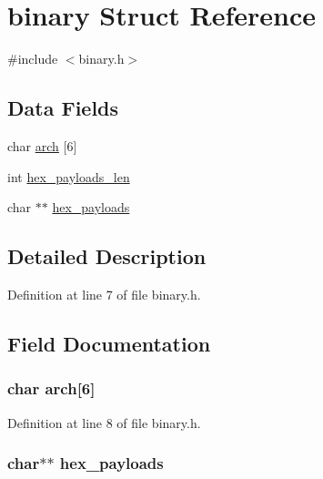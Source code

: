 \hypertarget{structbinary}{}\section{binary Struct Reference}
\label{structbinary}


{\ttfamily \#include $<$binary.\+h$>$}

\subsection*{Data Fields}
\begin{DoxyCompactItemize}
\item 
char \hyperlink{structbinary_a51de8a8ff4eea181532ea93a70052c48}{arch} \mbox{[}6\mbox{]}
\item 
int \hyperlink{structbinary_afc8f291557c42095685d2a9af0a3416a}{hex\+\_\+payloads\+\_\+len}
\item 
char $\ast$$\ast$ \hyperlink{structbinary_ae54411fb77f40653065d613c653083dd}{hex\+\_\+payloads}
\end{DoxyCompactItemize}


\subsection{Detailed Description}


Definition at line 7 of file binary.\+h.



\subsection{Field Documentation}
\subsubsection[{\texorpdfstring{arch}{arch}}]{\setlength{\rightskip}{0pt plus 5cm}char arch\mbox{[}6\mbox{]}}\hypertarget{structbinary_a51de8a8ff4eea181532ea93a70052c48}{}\label{structbinary_a51de8a8ff4eea181532ea93a70052c48}


Definition at line 8 of file binary.\+h.

\subsubsection[{\texorpdfstring{hex\+\_\+payloads}{hex_payloads}}]{\setlength{\rightskip}{0pt plus 5cm}char$\ast$$\ast$ hex\+\_\+payloads}\hypertarget{structbinary_ae54411fb77f40653065d613c653083dd}{}\label{structbinary_ae54411fb77f40653065d613c653083dd}


